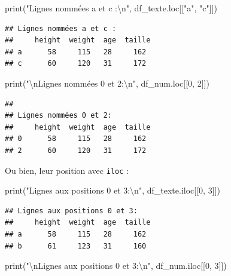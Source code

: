 \documentclass[12pt,]{book}
\newenvironment{Shaded}{\begin{snugshade}}{\end{snugshade}}
\newcommand{\DecValTok}[1]{\textcolor[rgb]{0.00,0.00,0.81}{#1}}
\newcommand{\CharTok}[1]{\textcolor[rgb]{0.31,0.60,0.02}{#1}}
\newcommand{\StringTok}[1]{\textcolor[rgb]{0.31,0.60,0.02}{#1}}
\newcommand{\BuiltInTok}[1]{#1}
\newcommand{\NormalTok}[1]{#1}
\numberwithin{equation}{section}
\numberwithin{countremarque}{section}
\begin{document}
\begin{Shaded}
\begin{Highlighting}[]
\BuiltInTok{print}\NormalTok{(}\StringTok{"Lignes nommées a et c :}\CharTok{\textbackslash{}n}\StringTok{"}\NormalTok{, df_texte.loc[[}\StringTok{"a"}\NormalTok{, }\StringTok{"c"}\NormalTok{]])}
\end{Highlighting}
\end{Shaded}

\begin{lstlisting}
## Lignes nommées a et c :
##     height  weight  age  taille
## a      58     115   28     162
## c      60     120   31     172
\end{lstlisting}

\begin{Shaded}
\begin{Highlighting}[]
\BuiltInTok{print}\NormalTok{(}\StringTok{"}\CharTok{\textbackslash{}n}\StringTok{Lignes nommées 0 et 2:}\CharTok{\textbackslash{}n}\StringTok{"}\NormalTok{, df_num.loc[[}\DecValTok{0}\NormalTok{, }\DecValTok{2}\NormalTok{]])}
\end{Highlighting}
\end{Shaded}

\begin{lstlisting}
## 
## Lignes nommées 0 et 2:
##     height  weight  age  taille
## 0      58     115   28     162
## 2      60     120   31     172
\end{lstlisting}

Ou bien, leur position avec \texttt{iloc} :

\begin{Shaded}
\begin{Highlighting}[]
\BuiltInTok{print}\NormalTok{(}\StringTok{"Lignes aux positions 0 et 3:}\CharTok{\textbackslash{}n}\StringTok{"}\NormalTok{, df_texte.iloc[[}\DecValTok{0}\NormalTok{, }\DecValTok{3}\NormalTok{]])}
\end{Highlighting}
\end{Shaded}

\begin{lstlisting}
## Lignes aux positions 0 et 3:
##     height  weight  age  taille
## a      58     115   28     162
## b      61     123   31     160
\end{lstlisting}

\begin{Shaded}
\begin{Highlighting}[]
\BuiltInTok{print}\NormalTok{(}\StringTok{"}\CharTok{\textbackslash{}n}\StringTok{Lignes aux positions 0 et 3:}\CharTok{\textbackslash{}n}\StringTok{"}\NormalTok{, df_num.iloc[[}\DecValTok{0}\NormalTok{, }\DecValTok{3}\NormalTok{]])}
\end{Highlighting}
\end{Shaded}
\end{document}
